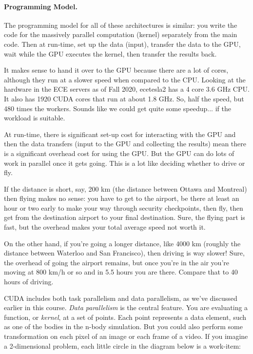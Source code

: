 \paragraph{Programming Model.} The programming
model for all of these architectures is similar: you write the code for
the massively parallel computation (kernel) separately from the main
code. Then at run-time, set up the data (input), transfer the data to the GPU, wait while the GPU executes the kernel, then transfer the results back. 

It makes sense to hand it over to the GPU because there are a lot of cores, although they run at a slower speed when compared to the CPU. Looking at the hardware in the ECE servers as of Fall 2020, ecetesla2 has a 4 core 3.6 GHz CPU. It also has 1920 CUDA cores that run at about 1.8 GHz. So, half the speed, but 480 times the workers. Sounds like we could get quite some speedup... if the workload is suitable.

At run-time, there is significant set-up cost for interacting with the GPU and then the data transfers (input to the GPU and collecting the results) mean there is a significant overhead cost for using the GPU. But the GPU can do lots of work in parallel once it gets going. This is a lot like deciding whether to drive or fly. 

If the distance is short, say, 200 km (the distance between Ottawa and Montreal) then flying makes no sense: you have to get to the airport, be there at least an hour or two early to make your way through security checkpoints, then fly, then get from the destination airport to your final destination. Sure, the flying part is fast, but the overhead makes your total average speed not worth it.

On the other hand, if you're going a longer distance, like 4000 km (roughly the distance between Waterloo and San Francisco), then driving is way slower! Sure, the overhead of going the airport remains, but once you're in the air you're moving at 800 km/h or so and in 5.5 hours you are there. Compare that to 40 hours of driving.

CUDA includes both task parallelism and data parallelism, as we've
discussed earlier in this course. \emph{Data parallelism} is the central
feature. You are evaluating a function, or \emph{kernel},
at a set of points. Each point represents a data element, such as one of the
bodies in the n-body simulation. But you could also perform some 
transformation on each pixel of an image or each frame of a video. If you 
imagine a 2-dimensional problem, each little circle in the diagram below is
a work-item:

